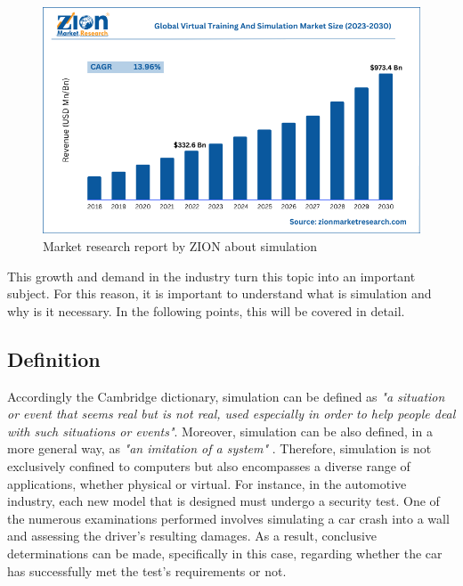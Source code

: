 \begin{figure}[H]
	\centering
 	\includegraphics[width=0.7\linewidth]{Images/ZION_MarketResearch.png}
 	\caption{Market research report by ZION about simulation \cite{zionMarketResearch}}
	 \label{fig_ZION_MarketResearch}
\end{figure}

This growth and demand in the industry turn this topic into an important subject. For this reason, it is important to understand what is 
simulation and why is it necessary. In the following points, this will be covered in detail.

\subsection{Definition}
\label{subsec:WhatIsSimulation}

Accordingly the Cambridge dictionary, simulation can be defined as \emph{"a situation or event that seems real but is not real, used especially 
in order to help people deal with such situations or events"}. Moreover, simulation can be also defined, in a more general way, as 
\emph{"an imitation of a system"} \cite{SimulationBook}. Therefore, simulation is not exclusively confined to computers but also encompasses a 
diverse range of applications, whether physical or virtual. For instance, in the automotive industry, each new model that is designed must 
undergo a security test. One of the numerous examinations performed involves simulating a car crash into a wall and assessing the driver's 
resulting damages. As a result, conclusive determinations can be made, specifically in this case, regarding whether the car has successfully 
met the test's requirements or not.

